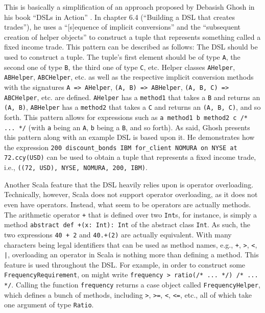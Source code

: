 \documentclass[article, type=bsc, colorback, accentcolor=tud8b, parskip=half, bibliography=totocnumbered]{tudthesis}
\begin{document}
This is basically a simplification of an approach proposed by Debasish Ghosh in his book ``DSLs in Action'' \cite{Ghosh:2010:DA:1965333}.
In chapter 6.4 (``Building a DSL that creates trades''), he uses a ``[s]equence of implicit conversions'' and the ``subsequent creation of helper objects'' to construct a tuple that represents something called a fixed income trade.
This pattern can be described as follows:
The DSL should be used to construct a tuple.
The tuple's first element should be of type \lstinline{A}, the second one of type \lstinline{B}, the third one of type \lstinline{C}, etc.
Helper classes \lstinline{AHelper}, \lstinline{ABHelper}, \lstinline{ABCHelper}, etc. as well as the respective implicit conversion methods with the signatures \lstinline{A => AHelper}, \lstinline{(A, B) => ABHelper}, \lstinline{(A, B, C) => ABCHelper}, etc. are defined.
\lstinline{AHelper} has a \lstinline{method1} that takes a \lstinline{B} and returns an \lstinline{(A, B)}, \lstinline{ABHelper} has a \lstinline{method2} that takes a \lstinline{C} and returns an \lstinline{(A, B, C)}, and so forth.
This pattern allows for expressions such as \lstinline{a method1 b method2 c /* ... */} (with \lstinline{a} being an \lstinline{A}, \lstinline{b} being a \lstinline{B}, and so forth).
As said, Ghosh presents this pattern along with an example DSL is based upon it.
He demonstrates how the expression \lstinline{200 discount_bonds IBM for_client NOMURA on NYSE at 72.ccy(USD)} can be used to obtain a tuple that represents a fixed income trade, i.e., \lstinline{((72, USD), NYSE, NOMURA, 200, IBM)}.

Another Scala feature that the DSL heavily relies upon is operator overloading.
Technically, however, Scala does not support operator overloading, as it does not even have operators.
Instead, what seem to be operators are actually methods.
The arithmetic operator \lstinline{+} that is defined over two \lstinline{Int}s, for instance, is simply a method \lstinline{abstract def +(x: Int): Int} of the abstract class \lstinline{Int}.
As such, the two expressions \lstinline{40 + 2} and \lstinline{40.+(2)} are actually equivalent.
With many characters being legal identifiers that can be used as method names, e.g., \lstinline{+}, \lstinline{>}, \lstinline{<}, \lstinline{|}, overloading an operator in Scala is nothing more than defining a method.
This feature is used throughout the DSL.
For example, in order to construct some \lstinline{FrequencyRequirement}, on might write \lstinline{frequency > ratio(/* ... */) /* ... */}.
Calling the function \lstinline{frequency} returns a case object called \lstinline{FrequencyHelper}, which defines a bunch of methods, including \lstinline{>}, \lstinline{>=}, \lstinline{<}, \lstinline{<=}, etc., all of which take one argument of type \lstinline{Ratio}.
\end{document}

